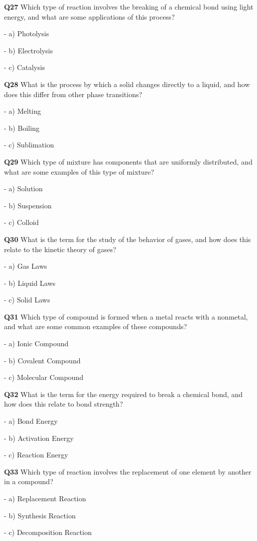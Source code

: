 \textbf{Q27} Which type of reaction involves the breaking of a chemical bond using light energy, and what are some applications of this process?\par
\quad - a) Photolysis\par
\quad - b) Electrolysis\par
\quad - c) Catalysis\par

\textbf{Q28} What is the process by which a solid changes directly to a liquid, and how does this differ from other phase transitions?\par
\quad - a) Melting\par
\quad - b) Boiling\par
\quad - c) Sublimation\par

\textbf{Q29} Which type of mixture has components that are uniformly distributed, and what are some examples of this type of mixture?\par
\quad - a) Solution\par
\quad - b) Suspension\par
\quad - c) Colloid\par

\textbf{Q30} What is the term for the study of the behavior of gases, and how does this relate to the kinetic theory of gases?\par
\quad - a) Gas Laws\par
\quad - b) Liquid Laws\par
\quad - c) Solid Laws\par

\textbf{Q31} Which type of compound is formed when a metal reacts with a nonmetal, and what are some common examples of these compounds?\par
\quad - a) Ionic Compound\par
\quad - b) Covalent Compound\par
\quad - c) Molecular Compound\par

\textbf{Q32} What is the term for the energy required to break a chemical bond, and how does this relate to bond strength?\par
\quad - a) Bond Energy\par
\quad - b) Activation Energy\par
\quad - c) Reaction Energy\par

\textbf{Q33} Which type of reaction involves the replacement of one element by another in a compound?\par
\quad - a) Replacement Reaction\par
\quad - b) Synthesis Reaction\par
\quad - c) Decomposition Reaction\par

